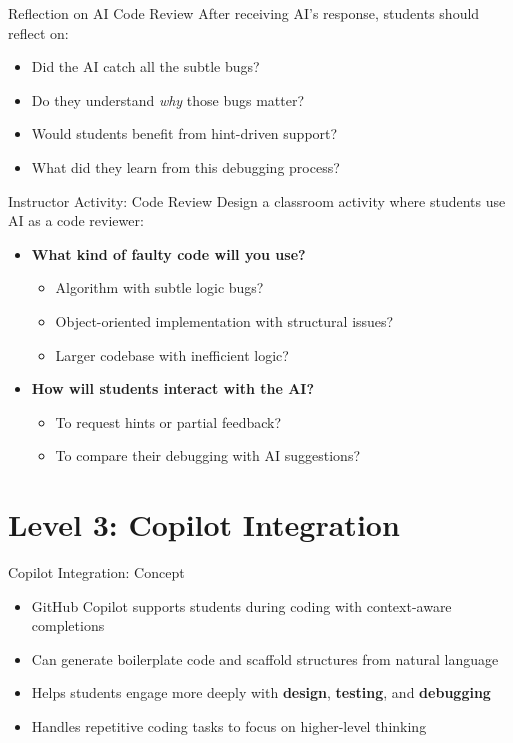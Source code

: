 \documentclass[xcolor=dvipsnames, aspectratio=169]{beamer}
\begin{document}
\begin{frame}{Reflection on AI Code Review}
  After receiving AI's response, students should reflect on:
  \begin{itemize}
    \item Did the AI catch all the subtle bugs?
    \item Do they understand \textit{why} those bugs matter?
    \item Would students benefit from hint-driven support?
    \item What did they learn from this debugging process?
  \end{itemize}
\end{frame}

\begin{frame}{Instructor Activity: Code Review}
  Design a classroom activity where students use AI as a code reviewer:
  
  \begin{itemize}
    \item \textbf{What kind of faulty code will you use?}
      \begin{itemize}
        \item Algorithm with subtle logic bugs?
        \item Object-oriented implementation with structural issues?
        \item Larger codebase with inefficient logic?
      \end{itemize}
    \item \textbf{How will students interact with the AI?}
      \begin{itemize}
        \item To request hints or partial feedback?
        \item To compare their debugging with AI suggestions?
      \end{itemize}
  \end{itemize}
\end{frame}

\section{Level 3: Copilot Integration}

\begin{frame}{Copilot Integration: Concept}
  \begin{itemize}
    \item GitHub Copilot supports students during coding with context-aware completions
    \item Can generate boilerplate code and scaffold structures from natural language
    \item Helps students engage more deeply with \textbf{design}, \textbf{testing}, and \textbf{debugging}
    \item Handles repetitive coding tasks to focus on higher-level thinking
  \end{itemize}
\end{frame}
\end{document}
